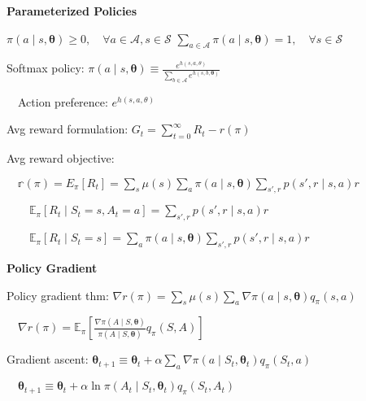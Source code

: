 \documentclass[twocolumn]{article}
\begin{document}
\dotfill

\textbf{Parameterized Policies}

$\pi(a \mid s, \boldsymbol \theta) \geq 0, \quad \forall a \in \mathcal A, s \in \mathcal S$ \hfill $\sum_{a \in \mathcal A} \pi(a \mid s, \boldsymbol \theta) = 1, \quad \forall s \in \mathcal S$

Softmax policy: $\pi(a \mid s, \boldsymbol \theta) \equiv \frac{e^{h(s,a, \theta)}}{\sum_{b\in \mathcal A} e^{h(s, b, \boldsymbol \theta)}}$

$\quad$Action preference: $e^{h(s,a, \theta)}$

Avg reward formulation: $G_t = \sum_{t=0}^\infty R_t - r(\pi)$

Avg reward objective:

$\quad \mathbb r(\pi) = E_\pi[R_t] = \sum_s \mu(s) \sum_a \pi(a \mid s, \boldsymbol \theta) \sum_{s', r} p(s', r \mid s, a) r$

$\quad\quad \mathbb E_\pi[R_t \mid S_t = s, A_t = a] = \sum_{s', r} p(s', r \mid s, a) r$

$\quad\quad \mathbb E_\pi[R_t \mid S_t = s] = \sum_a \pi(a \mid s, \boldsymbol \theta) \sum_{s', r} p(s', r \mid s, a) r$

\dotfill

\textbf{Policy Gradient}

Policy gradient thm: $\nabla r(\pi) = \sum_s \mu(s) \sum_a \nabla \pi(a \mid s, \boldsymbol \theta) q_\pi(s,a)$

$\quad \nabla r(\pi) = \mathbb E_\pi \left[ \frac{\nabla \pi (A \mid S, \boldsymbol \theta)}{\pi(A \mid S, \boldsymbol \theta)} q_\pi(S, A) \right]$

Gradient ascent: $\boldsymbol \theta_{t+1} \equiv \boldsymbol \theta_t + \alpha \sum_a \nabla \pi(a \mid S_t, \boldsymbol \theta_t) q_\pi(S_t, a)$

$\quad \boldsymbol \theta_{t+1} \equiv \boldsymbol \theta_t + \alpha \ln \pi(A_t \mid S_t, \boldsymbol \theta_t) q_\pi(S_t, A_t)$
\end{document}
